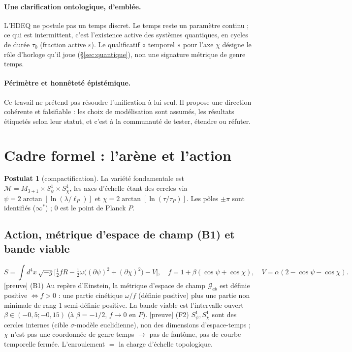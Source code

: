 \documentclass[11pt,a4paper]{article}
\newcommand{\statut}[1]{{\footnotesize\textsf{[#1]}}}
\theoremstyle{definition}
\newtheorem{postulat}{Postulat}
\begin{document}
\paragraph{Une clarification ontologique, d'embl\'ee.} L'HDEQ ne postule pas un temps discret.
Le temps reste un param\`etre continu ; ce qui est intermittent, c'est l'existence active des
syst\`emes quantiques, en cycles de dur\'ee $\tau_0$ (fraction active $\varepsilon$). Le
qualificatif « temporel » pour l'axe $\chi$ d\'esigne le r\^ole d'horloge qu'il joue
(\S\ref{sec:quantique}), non une signature m\'etrique de genre temps.

\paragraph{P\'erim\`etre et honn\^etet\'e \'epist\'emique.} Ce travail ne pr\'etend pas r\'esoudre
l'unification \`a lui seul. Il propose une direction coh\'erente et falsifiable : les choix de
mod\'elisation sont assum\'es, les r\'esultats \'etiquet\'es selon leur statut, et c'est \`a la
communaut\'e de tester, \'etendre ou r\'efuter.

\section{Cadre formel : l'ar\`ene et l'action}
\begin{postulat}[compactification]
La vari\'et\'e fondamentale est $\mathcal{M}=M_{3+1}\times S^1_\psi\times S^1_\chi$, les axes
d'\'echelle \'etant des cercles via $\psi=2\arctan[\ln(\lambda/\ell_P)]$ et
$\chi=2\arctan[\ln(\tau/\tau_P)]$. Les p\^oles $\pm\pi$ sont identifi\'es ($\infty^*$) ; $0$ est
le point de Planck $P$.
\end{postulat}

\subsection{Action, m\'etrique d'espace de champ (B1) et bande viable}
\begin{equation}
S=\int d^4x\,\sqrt{-g}\Big[\tfrac12 fR-\tfrac12\omega\big((\partial\psi)^2+(\partial\chi)^2\big)-V\Big],
\quad f=1+\beta(\cos\psi+\cos\chi),\quad V=\alpha(2-\cos\psi-\cos\chi).
\end{equation}
\statut{preuve} (B1) Au repère d'Einstein, la m\'etrique d'espace de champ $\mathcal{G}_{ab}$
est d\'efinie positive $\Leftrightarrow f>0$ : une partie cin\'etique $\omega/f$ (d\'efinie
positive) plus une partie non minimale de rang 1 semi-d\'efinie positive. La bande viable est
l'intervalle ouvert $\beta\in(-0{,}5;-0{,}15)$ (\`a $\beta=-1/2$, $f\to0$ en $P$).
\statut{preuve} (F2) $S^1_\psi,S^1_\chi$ sont des cercles internes (cible $\sigma$-mod\`ele
euclidienne), non des dimensions d'espace-temps ; $\chi$ n'est pas une coordonn\'ee de genre
temps $\to$ pas de fant\^ome, pas de courbe temporelle ferm\'ee. L'enroulement $=$ la charge
d'\'echelle topologique.
\end{document}
